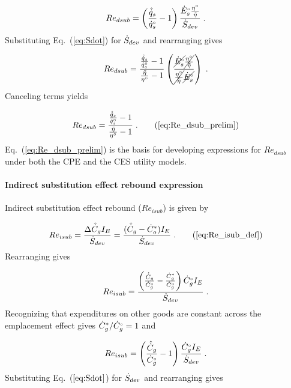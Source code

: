 \begin{equation}
  Re_{dsub} = \left( \frac{\hat{\dot{q}}_s}{{}{\dot{q}}^{\scriptscriptstyle \circ}_s} - 1  \right)
              \frac{{}{\dot{E}}^{\scriptscriptstyle \circ}_s \frac{{}{\eta}^{\scriptscriptstyle \circ}}{\tilde{\eta}}}{\dot{S}_{dev}} \; .
\end{equation}
%
Substituting Eq.~(\ref{eq:Sdot}) for $\dot{S}_{dev}$ and rearranging gives

\begin{equation}
  Re_{dsub} = \frac{\frac{\hat{\dot{q}}_s}{{}{\dot{q}}^{\scriptscriptstyle \circ}_s} - 1}{\frac{\tilde{\eta}}{{}{\eta}^{\scriptscriptstyle \circ}} - 1}
              \left( \frac{\cancel{{}{\dot{E}}^{\scriptscriptstyle \circ}_s} \cancel{\frac{{}{\eta}^{\scriptscriptstyle \circ}}{\tilde{\eta}}}    }{  \cancel{\frac{{}{\eta}^{\scriptscriptstyle \circ}}{\tilde{\eta}}}    \cancel{{}{\dot{E}}^{\scriptscriptstyle \circ}_s}} \right) \; .
\end{equation}
%
Canceling terms yields

\begin{equation}
  Re_{dsub} = \frac{\frac{\rasub{q}_s}{\rbempl{q}_s} - 1}{\frac{\amacro{\eta}}{\bempl{\eta}} - 1} \; .
                                                               \tag{\ref{eq:Re_dsub_prelim}}
\end{equation}
%
Eq.~(\ref{eq:Re_dsub_prelim}) is the basis for developing 
expressions for $Re_{dsub}$ 
under both the CPE and the CES utility models.


\paragraph{Indirect substitution effect rebound expression}
\label{sec:Reisub_expression}

Indirect substitution effect rebound ($Re_{isub}$) is given by

\begin{equation}
  Re_{isub} = \frac{\Delta \rasub{C}_g I_E}{\Sdot} = \frac{(\rasub{C}_g - \rbsub{C}_{o}) I_E}{\Sdot} \; . \tag{\ref{eq:Re_isub_def}}
\end{equation}
%
Rearranging gives

\begin{equation}
  Re_{isub} = \frac{\left(\frac{\hat{\dot{C}}_g}{{}{\dot{C}}^{\scriptscriptstyle \circ}_g} - \frac{{\dot{C}}^*_g}{{}{\dot{C}}^{\scriptscriptstyle \circ}_g}  \right) {}{\dot{C}}^{\scriptscriptstyle \circ}_g I_E }{\dot{S}_{dev}} \; .
\end{equation}
%
Recognizing that expenditures on other goods are constant across the emplacement effect gives
${\dot{C}}^*_g/{}{\dot{C}}^{\scriptscriptstyle \circ}_g = 1$ and

\begin{equation}
  Re_{isub} = \left(\frac{\hat{\dot{C}}_g}{{}{\dot{C}}^{\scriptscriptstyle \circ}_g} - 1  \right) \frac{{}{\dot{C}}^{\scriptscriptstyle \circ}_g I_E }{\dot{S}_{dev}} \; .
\end{equation}
%
Substituting Eq.~($\ref{eq:Sdot}$) for $\dot{S}_{dev}$ and rearranging gives

